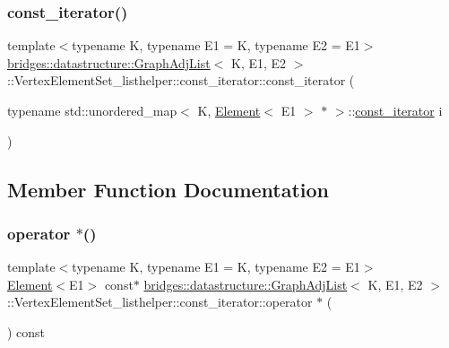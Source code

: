 \subsubsection{\texorpdfstring{const\_iterator()}{const\_iterator()}}
{\footnotesize\ttfamily template$<$typename K, typename E1 = K, typename E2 = E1$>$ \\
\mbox{\hyperlink{classbridges_1_1datastructure_1_1_graph_adj_list}{bridges\+::datastructure\+::\+Graph\+Adj\+List}}$<$ K, E1, E2 $>$\+::Vertex\+Element\+Set\+\_\+listhelper\+::const\+\_\+iterator\+::const\+\_\+iterator (\begin{DoxyParamCaption}\item[{typename std\+::unordered\+\_\+map$<$ K, \mbox{\hyperlink{classbridges_1_1datastructure_1_1_element}{Element}}$<$ E1 $>$ $\ast$ $>$\+::\mbox{\hyperlink{classbridges_1_1datastructure_1_1_graph_adj_list_1_1_vertex_element_set__listhelper_1_1const__iterator}{const\+\_\+iterator}}}]{i }\end{DoxyParamCaption})\hspace{0.3cm}{\ttfamily [inline]}}



\subsection{Member Function Documentation}
\mbox{\label{classbridges_1_1datastructure_1_1_graph_adj_list_1_1_vertex_element_set__listhelper_1_1const__iterator_ac38dbc97be4bfd788306e827ab683211}} 
\subsubsection{\texorpdfstring{operator $\ast$()}{operator *()}}
{\footnotesize\ttfamily template$<$typename K, typename E1 = K, typename E2 = E1$>$ \\
\mbox{\hyperlink{classbridges_1_1datastructure_1_1_element}{Element}}$<$E1$>$ const$\ast$ \mbox{\hyperlink{classbridges_1_1datastructure_1_1_graph_adj_list}{bridges\+::datastructure\+::\+Graph\+Adj\+List}}$<$ K, E1, E2 $>$\+::Vertex\+Element\+Set\+\_\+listhelper\+::const\+\_\+iterator\+::operator $\ast$ (\begin{DoxyParamCaption}{ }\end{DoxyParamCaption}) const\hspace{0.3cm}{\ttfamily [inline]}}

